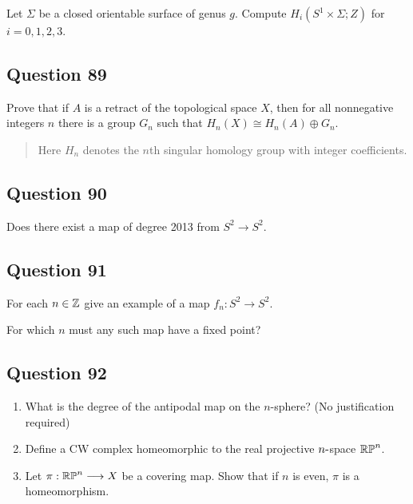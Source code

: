 \documentclass[12pt]{article}
\begin{document}
Let \(\Sigma\) be a closed orientable surface of genus \(g\). Compute
\(H_i(S^1 \times \Sigma; Z)\) for \(i = 0, 1, 2, 3\).

\hypertarget{question-89-2}{%
\subsection{Question 89}\label{question-89-2}}

Prove that if \(A\) is a retract of the topological space \(X\), then
for all nonnegative integers \(n\) there is a group \(G_n\) such that
\(H_{n} (X) \cong H_{n} (A) \oplus G_n\).

\begin{quote}
Here \(H_{n}\) denotes the \(n\)th singular homology group with integer
coefficients.
\end{quote}

\hypertarget{question-90-2}{%
\subsection{Question 90}\label{question-90-2}}

Does there exist a map of degree 2013 from \(S^2 \to S^2\).

\hypertarget{question-91-2}{%
\subsection{Question 91}\label{question-91-2}}

For each \(n \in {\mathbb{Z}}\) give an example of a map \(f_n : S^2 \to S^2\).

For which \(n\) must any such map have a fixed point?

\hypertarget{question-92-2}{%
\subsection{Question 92}\label{question-92-2}}

\begin{enumerate}
\def\labelenumi{\alph{enumi}.}
\item
  What is the degree of the antipodal map on the \(n\)-sphere? (No
  justification required)
\item
  Define a CW complex homeomorphic to the real projective
  \(n{\hbox{-}}\)space \({\mathbb{RP}}^n\).
\item
  Let \(\pi : {\mathbb{RP}}^n \longrightarrow X\) be a covering map. Show that if \(n\) is
  even, \(\pi\) is a homeomorphism.
\end{enumerate}
\end{document}
